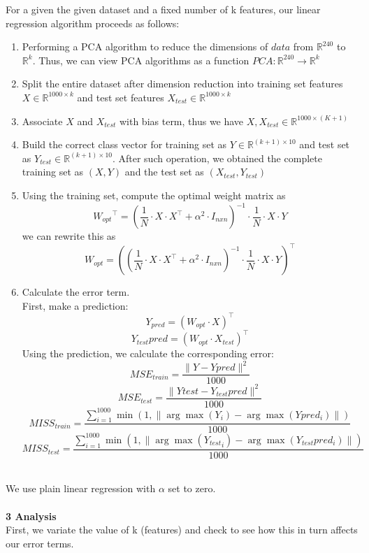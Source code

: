 \documentclass[a4paper]{article}
\begin{document}
For a given the given dataset and a fixed number of k features, our linear regression algorithm proceeds as follows: 
\begin{enumerate}
\item  Performing a PCA algorithm to reduce the dimensions of $data$ from $\mathbb{R}^{240}$ to $\mathbb{R}^{k}$. Thus, we can view PCA algorithms as a function $PCA: \mathbb{R}^{240} \to \mathbb{R}^{k}$
\item Split the entire dataset after dimension reduction into training set features $X \in \mathbb{R}^{1000 \times k}$ and test set features $X_{test} \in \mathbb{R}^{1000 \times k}$
\item Associate $X$ and $X_{test}$ with bias term, thus we have $X, X_{test} \in \mathbb{R}^{1000 \times (K + 1)}$
\item Build the correct class vector for training set as $Y \in \mathbb{R}^{(k + 1) \times 10}$ and test set as $Y_{test} \in \mathbb{R}^{(k + 1) \times 10}$. After such operation, we obtained the complete training set as $(X, Y)$ and the test set as $(X_{test}, Y_{test})$
\item Using the training set, compute the optimal weight matrix as 
$$ {W_{opt}}^\top = (\frac{1}{N} \cdot X \cdot X^\top + \alpha^2 \cdot I_{nxn})^{-1} \cdot \frac{1}{N} \cdot X \cdot Y $$
we can rewrite this as 
$$ W_{opt} = ((\frac{1}{N} \cdot X \cdot X^\top + \alpha^2 \cdot I_{nxn})^{-1} \cdot \frac{1}{N} \cdot X \cdot Y)^\top $$
\item Calculate the error term. \\
First, make a prediction: 
$$ Y_{pred} = (W_{opt} \cdot X)^\top $$
$$ Y_{test}pred = (W_{opt} \cdot X_{test})^\top $$
Using the prediction, we calculate the corresponding error:
$$ MSE_{train} = \frac{\|Y - Ypred\|^2}{1000} $$
$$ MSE_{test} = \frac{\|Ytest - Y_{test}pred\|^2}{1000} $$
$$ MISS_{train} = \frac{\sum_{i = 1}^{1000} \min(1, \|\arg\max(Y_i) - \arg\max(Ypred_i)\|)}{1000} $$
$$ MISS_{test} = \frac{\sum_{i = 1}^{1000} \min(1, \|\arg\max({Y_{test}}_i) - \arg\max(Y_{test}pred_i)\|)}{1000} $$ \\ 
\end{enumerate}

We use plain linear regression with $\alpha$ set to zero. \\ \\
\newpage
\textbf{{\Large 3 Analysis}} \\ 

First, we variate the value of k (features) and check to see how this in turn affects our error terms. \\
\end{document}
